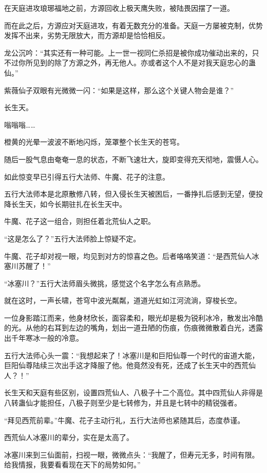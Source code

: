\begin{this_body}
在天庭进攻琅琊福地之前，方源回收上极天鹰失败，被陆畏因摆了一道。

而在此之后，方源应对天庭进攻，有着无数充分的准备。天庭一方屡被克制，优势发挥不出来，劣势无限放大，而方源却是恰恰相反。

龙公沉吟：“其实还有一种可能。上一世一视同仁杀招是被你成功催动出来的，只不过你所见到的除了方源之外，再无他人。亦或者这个人不是对我天庭忠心的蛊仙。”

紫薇仙子双眼有光微微一闪：“如果是这样，那么这个关键人物会是谁？”

长生天。

嗡嗡嗡……

橙黄的光晕一波波不断地闪烁，笼罩整个长生天的苍穹。

随后一股气息由奄奄一息的状态，不断飞速壮大，旋即变得充天彻地，震慑人心。

如此惊变早已引得五行大法师、牛魔、花子的注意。

五行大法师本是北原散修八转，但入侵长生天被困后，一番挣扎后感到无望，便投降长生天，如今长期驻扎在长生天中。

牛魔、花子这一组合，则担任着北荒仙人之职。

“这是怎么了？”五行大法师脸上惊疑不定。

牛魔、花子却对视一眼，均见到对方的惊喜之色。后者咯咯笑道：“是西荒仙人冰塞川苏醒了！”

“冰塞川？”五行大法师眉头微挑，感觉这个名字怎么有点熟悉。

就在这时，一声长啸，苍穹中波光粼粼，道道光虹如江河流淌，穿梭长空。

一位身影踏江而来，他身材欣长，面容柔和，眼光却是极为锐利冰冷，散发出冷酷的光。从他的右耳到左边的嘴角，划出一道丑陋的伤痕，伤痕微微散着白光，透露出千年寒冰一般的冷意。

五行大法师心头一震：“我想起来了！冰塞川是和巨阳仙尊一个时代的宙道大能，巨阳仙尊陆续三次出手这才降服了他。他竟然没有死，还成了长生天中的西荒仙人？！”

长生天和天庭有些区别，设置四荒仙人、八极子十二个高位。其中四荒仙人非得是八转蛊仙才能担任，八极子则至少是七转修为，并且是七转中的精锐强者。

“拜见西荒前辈。”牛魔、花子主动行礼，五行大法师也紧随其后，态度恭谨。

西荒仙人冰塞川的辈分，实在是太高了。

冰塞川来到三仙面前，扫视一眼，微微点头：“我醒了，但寿元无多，时间有限。给我情报，我要看看现在天下的局势如何。”


\end{this_body}
